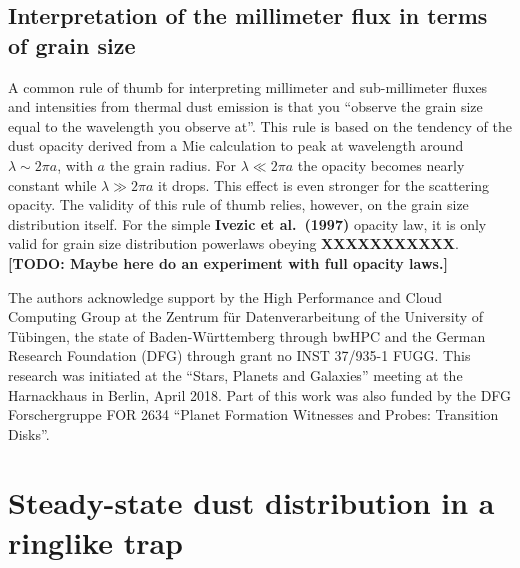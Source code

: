 \documentclass{aa}
\begin{document}
\subsection{Interpretation of the millimeter flux in terms of grain size}
A common rule of thumb for interpreting millimeter and sub-millimeter
fluxes and intensities from thermal dust emission is that you ``observe
the grain size equal to the wavelength you observe at''. This rule is
based on the tendency of the dust opacity derived from a Mie calculation
to peak at wavelength around $\lambda\sim 2\pi a$, with $a$ the grain
radius. For $\lambda \ll 2\pi a$ the opacity becomes nearly constant
while $\lambda \gg 2\pi a$ it drops. This effect is even stronger for
the scattering opacity. The validity of this rule of thumb relies,
however, on the grain size distribution itself. For the simple
{\bf Ivezic et al.~(1997)} opacity law, it is only valid for
grain size distribution powerlaws obeying {\bf XXXXXXXXXXX}.
{\bf [TODO: Maybe here do an experiment with full opacity laws.]}




\begin{acknowledgements}
  The authors acknowledge support
  by the High Performance and Cloud Computing Group at the Zentrum f\"ur
  Datenverarbeitung of the University of T\"ubingen, the state of
  Baden-W\"urttemberg through bwHPC and the German Research Foundation (DFG)
  through grant no INST 37/935-1 FUGG. This research was initiated at the
  ``Stars, Planets and Galaxies'' meeting at the Harnackhaus in Berlin,
  April 2018. Part of this work was also funded by the DFG Forschergruppe
  FOR 2634 ``Planet Formation Witnesses and Probes: Transition Disks''.
\end{acknowledgements}


\begingroup


\endgroup

\appendix

\section{Steady-state dust distribution in a ringlike trap}
\label{sec-steady-state-analytic-trap-model}
%
\end{document}
